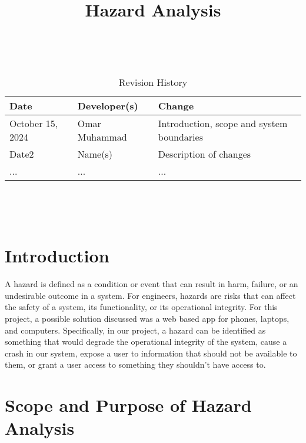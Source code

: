 \documentclass{article}
\title{Hazard Analysis\\\progname}
\author{\authname}
\date{}
\begin{document}
\maketitle
\thispagestyle{empty}

~\newpage


\begin{table}[hp]
\caption{Revision History} \label{TblRevisionHistory}
\begin{tabularx}{\textwidth}{llX}
\toprule
\textbf{Date} & \textbf{Developer(s)} & \textbf{Change}\\
\midrule
October 15, 2024 & Omar Muhammad & Introduction, scope and system boundaries\\
Date2 & Name(s) & Description of changes\\
... & ... & ...\\
\bottomrule
\end{tabularx}
\end{table}

~\newpage

\tableofcontents

~\newpage



\section{Introduction}

A hazard is defined as a condition or event that can result in harm, failure, or an undesirable outcome in a system. For engineers, hazards are risks that can affect the safety of a system, its functionality, or its operational integrity. For this project, a possible solution discussed was a web based app for phones, laptops, and computers. Specifically, in our project, a hazard can be identified as something that would degrade the operational integrity of the system, cause a crash in our system, expose a user to information that should not be available to them, or grant a user access to something they shouldn't have access to.

\section{Scope and Purpose of Hazard Analysis}
\end{document}
